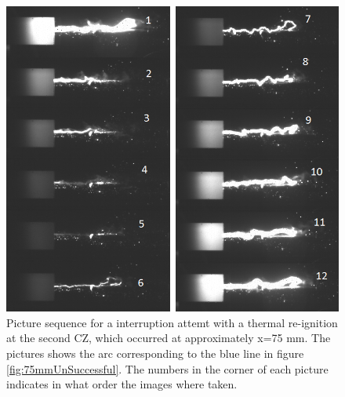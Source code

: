 \documentclass[10pt,b5paper,twoside]{article}
\begin{document}
\begin{figure}[H]
\centering
\includegraphics[scale=0.7, angle =0 ]{Bilder/Results/100_75_TR_TR.png}
\caption{Picture sequence for a interruption attemt with a thermal re-ignition at the second CZ, which occurred at approximately x=75 mm. The pictures shows the arc corresponding to the blue line in figure \ref{fig:75mmUnSuccessful}. The numbers in the corner of each picture indicates in what order the images where taken.} \label{fig:arcingVoltage_test_73_blue_TR}
\end{figure}
\end{document}
